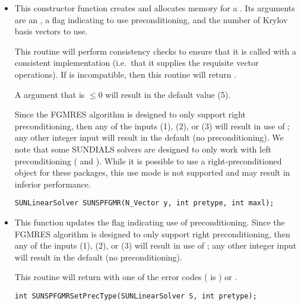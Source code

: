 \begin{itemize}


\item {}

  This constructor function creates and allocates memory for a {\spfgmr}
  .  Its arguments are an {\nvector}, a flag
  indicating to use preconditioning, and the number of Krylov basis
  vectors to use. 

  This routine will perform consistency checks to ensure that it is
  called with a consistent {\nvector} implementation (i.e.~that it
  supplies the requisite vector operations).  If  is
  incompatible, then this routine will return .

  A  argument that is $\le0$ will result in the default
  value (5).

  Since the FGMRES algorithm is designed to only support right
  preconditioning, then any of the 
  inputs  (1),  (2), or 
  (3) will result in use of ;  any other integer input
  will result in the default (no preconditioning).  We note that some
  SUNDIALS solvers are designed to only work with left preconditioning
  ({\ida} and {\idas}). While it is possible to use a
  right-preconditioned {\sunlinsolspfgmr} object for these packages,
  this use mode is not supported and may result in inferior
  performance.

  \verb|SUNLinearSolver SUNSPFGMR(N_Vector y, int pretype, int maxl);|


\item {}

  This function updates the flag indicating use of preconditioning.
  Since the FGMRES algorithm is designed to only support right
  preconditioning, then any of the 
  inputs  (1),  (2), or 
  (3) will result in use of ;  any other integer input
  will result in the default (no preconditioning).

  This routine will return with one of the error codes
   ( is ) or .
  
  \verb|int SUNSPFGMRSetPrecType(SUNLinearSolver S, int pretype);|



\end{itemize}
